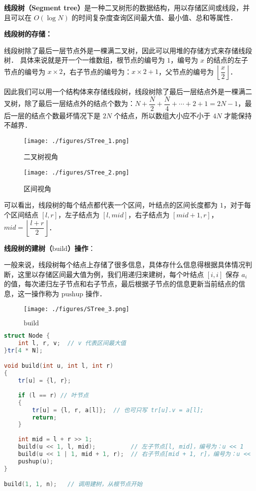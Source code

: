 
\textbf{线段树（Segment tree）}是一种二叉树形的数据结构，用以存储区间或线段，并且可以在 $O(\log N)$ 的时间复杂度查询区间最大值、最小值、总和等属性．

\textbf{线段树的存储：}

线段树除了最后一层节点外是一棵满二叉树，因此可以用堆的存储方式来存储线段树．
具体来说就是开一个一维数组，根节点的编号为 $1$，编号为 $x$ 的结点的左子节点的编号为 $x \times 2$，右子节点的编号为：$x \times 2 + 1$，父节点的编号为 $\left\lfloor\dfrac{x}{2}\right\rfloor$．

因此我们可以用一个结构体来存储线段树，线段树除了最后一层结点外是一棵满二叉树，除了最后一层结点外的结点个数为：$N + \dfrac{N}{2} + \dfrac{N}{4} + \cdots + 2 + 1 = 2N - 1$，最后一层的结点个数最坏情况下是 $2N$ 个结点，所以数组大小应不小于 $4N$ 才能保持不越界．

\begin{figure}[ht]
\centering
\texttt{[image: ./figures/STree\_1.png]}
\caption{二叉树视角} \label{STree_fig1}
\end{figure}

\begin{figure}[ht]
\centering
\texttt{[image: ./figures/STree\_2.png]}
\caption{区间视角} \label{STree_fig2}
\end{figure}


可以看出，线段树的每个结点都代表一个区间，叶结点的区间长度都为 $1$，对于每个区间结点 $[l, r]$，左子结点为 $[l, mid]$，右子结点为 $[mid + 1, r]$，$mid = \left\lfloor\dfrac{l+r}{2}\right\rfloor$．

\textbf{线段树的建树（$\text{build}$）操作}：

一般来说，线段树每个结点上存储了很多信息，具体存什么信息得根据具体情况判断，这里以存储区间最大值为例，我们用递归来建树，每个叶结点 $[i, i]$ 保存 $a_i$ 的值，每次递归左子节点和右子节点，最后根据子节点的信息更新当前结点的信息，这一操作称为 $\text{pushup}$ 操作．

\begin{figure}[ht]
\centering
\texttt{[image: ./figures/STree\_3.png]}
\caption{$\text{build}$} \label{STree_fig3}
\end{figure}


\begin{lstlisting}[language=cpp]
struct Node {
    int l, r, v;  // v 代表区间最大值
}tr[4 * N];

void build(int u, int l, int r) 
{
    tr[u] = {l, r};
    
    if (l == r) // 叶节点
    {
        tr[u] = {l, r, a[l]};  // 也可只写 tr[u].v = a[l];
        return;
    }
    
    int mid = l + r >> 1;
    build(u << 1, l, mid);          // 左子节点[l, mid]，编号为：u << 1
    build(u << 1 | 1, mid + 1, r);  // 右子节点[mid + 1, r]，编号为：u << 1 | 1
    pushup(u);
}

build(1, 1, n);   // 调用建树，从根节点开始
\end{lstlisting}


